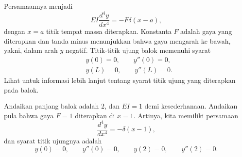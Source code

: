 Persamaannya menjadi
\begin{equation*}
EI \frac{d^4 y}{dx^4} = -F \delta(x-a) ,
\end{equation*}
dengan $x=a$ titik tempat massa diterapkan.  Konstanta $F$ adalah gaya
yang diterapkan dan tanda minus menunjukkan bahwa gaya mengarah ke bawah, yakni, dalam
arah $y$ negatif.  Titik-titik ujung
balok memenuhi syarat
\begin{align*}
& y(0) = 0, \qquad y''(0) = 0, \\
& y(L) = 0, \qquad y''(L) = 0.
\end{align*}
Lihat  untuk informasi lebih lanjut tentang syarat
titik ujung yang diterapkan pada balok.


\begin{example} \label{lt:examplebeam}
Andaikan panjang balok adalah 2, dan $EI=1$ demi
kesederhanaan.  Andaikan pula bahwa gaya $F=1$ diterapkan di $x=1$.
Artinya, kita memiliki persamaan
\begin{equation*}
\frac{d^4 y}{dx^4} = -\delta(x-1) ,
\end{equation*}
dan syarat titik ujungnya adalah
\begin{equation*}
y(0) = 0, \qquad y''(0) = 0, \qquad
y(2) = 0, \qquad y''(2) = 0.
\end{equation*}


\end{example}
